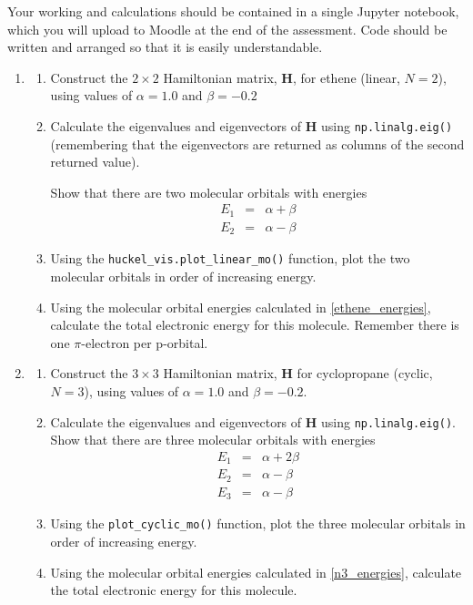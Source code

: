 \documentclass[a4paper]{article}
\newcommand{\bvec}[1]{\boldsymbol{\mathbf{#1}}}
\begin{document}
Your working and calculations should be contained in a single Jupyter notebook, which you will upload to Moodle at the end of the assessment. Code should be written and arranged so that it is easily understandable.

\begin{enumerate}
  \item
  \begin{enumerate}
  \item Construct the $2\times2$ Hamiltonian matrix, $\bvec{H}$, for ethene (linear, $N=2$), using values of $\alpha=1.0$ and $\beta=-0.2$
  \item \label{ethene_energies}Calculate the eigenvalues and eigenvectors of $\bvec{H}$ using \texttt{np.linalg.eig()} (remembering that the eigenvectors are returned as columns of the second returned value).

  Show that there are two molecular orbitals with energies 
    \begin{eqnarray}
    E_1 & = & \alpha+\beta \\
    E_2 & = & \alpha-\beta
    \end{eqnarray}
  \item Using the \texttt{huckel\_vis.plot\_linear\_mo()} function, plot the two molecular orbitals in order of increasing energy. 
  \item Using the molecular orbital energies calculated in \ref{ethene_energies}, calculate the total electronic energy for this molecule. Remember there is one $\pi$-electron per p-orbital.
  \end{enumerate}
  \item
  \begin{enumerate}
  \item Construct the $3\times3$ Hamiltonian matrix, $\bvec{H}$ for cyclopropane (cyclic, $N=3$), using values of $\alpha=1.0$ and $\beta=-0.2$.
  \item \label{n3_energies}Calculate the eigenvalues and eigenvectors of $\bvec{H}$ using \texttt{np.linalg.eig()}. \\ Show that there are three molecular orbitals with energies 
    \begin{eqnarray}
    E_1 & = & \alpha+2\beta \\
    E_2 & = & \alpha-\beta \\
    E_3 & = & \alpha-\beta
    \end{eqnarray}
  \item Using the \texttt{plot\_cyclic\_mo()} function, plot the three molecular orbitals in order of increasing energy. 
  \item Using the molecular orbital energies calculated in \ref{n3_energies}, calculate the total electronic energy for this molecule.


\end{enumerate}
\end{enumerate}
\end{document}
